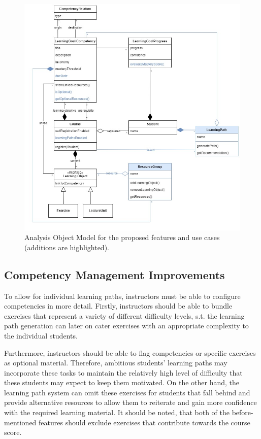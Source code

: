 \documentclass[a4paper,12pt,twoside]{article}
\begin{document}
\begin{figure}[h!]
        \centering
        \includegraphics[width=\linewidth]{figures/ObjectModel (4).jpg}
        \caption{Analysis Object Model for the proposed features and use cases (additions are highlighted).}
        \label{fig:AOM}
\end{figure}

\subsection{Competency Management Improvements}
To allow for individual learning paths, instructors must be able to configure competencies in more detail. Firstly, instructors should be
able to bundle exercises that represent a variety of different difficulty levels, s.t. the learning path generation can later on cater exercises
with an appropriate complexity to the individual students.

Furthermore, instructors should be able to flag competencies or specific exercises as optional material. Therefore, ambitious students' learning paths
may incorporate these tasks to maintain the relatively high level of difficulty that these students may expect to keep them motivated.
On the other hand, the learning path system can omit these exercises for students that fall behind and provide alternative resources to allow them
to reiterate and gain more confidence with the required learning material.
It should be noted, that both of the before-mentioned features should exclude exercises that contribute towards the course score.
\end{document}
